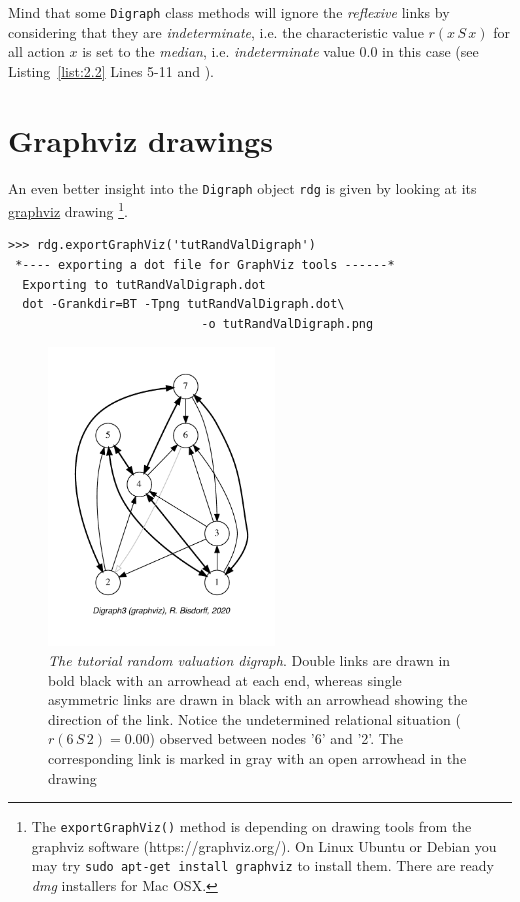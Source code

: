 Mind that some \texttt{Digraph} class methods will ignore the \emph{reflexive} links by considering that they are \emph{indeterminate}, i.e. the characteristic value $r(x\,S\,x)$ for all action $x$ is set to the \emph{median}, i.e. \emph{indeterminate} value $0.0$ in this case (see Listing~\vref{list:2.2} Lines 5-11 and \citet{BIS-2004a}).

\section{Graphviz drawings}
\label{sec:2.2}

An even better insight into the \texttt{Digraph} object \texttt{rdg} is given by looking at its \href{https://graphviz.org/}{graphviz} drawing \citep{graphviz}\footnote{The \texttt{exportGraphViz()} method is depending on drawing tools from the graphviz software (https://graphviz.org/). On Linux Ubuntu or Debian you may try \texttt{sudo apt-get install graphviz} to install them. There are ready \emph{dmg} installers for Mac OSX.}.
\begin{lstlisting}
>>> rdg.exportGraphViz('tutRandValDigraph')
 *---- exporting a dot file for GraphViz tools ------*
  Exporting to tutRandValDigraph.dot
  dot -Grankdir=BT -Tpng tutRandValDigraph.dot\
                           -o tutRandValDigraph.png
\end{lstlisting}
\begin{figure}[ht]
\sidecaption[t]
\includegraphics[width=6cm]{Figures/2-1-tutRandValDigraph.pdf}
\caption{\emph{The tutorial random valuation digraph}. Double links are drawn in bold black with an arrowhead at each end, whereas single asymmetric links are drawn in black with an arrowhead showing the direction of the link. Notice the undetermined relational situation ($r(6\,S\,2) = 0.00$) observed between nodes '6' and '2'. The corresponding link is marked in gray with an open arrowhead in the drawing}
\label{fig:2.1}       %
\end{figure}
  
